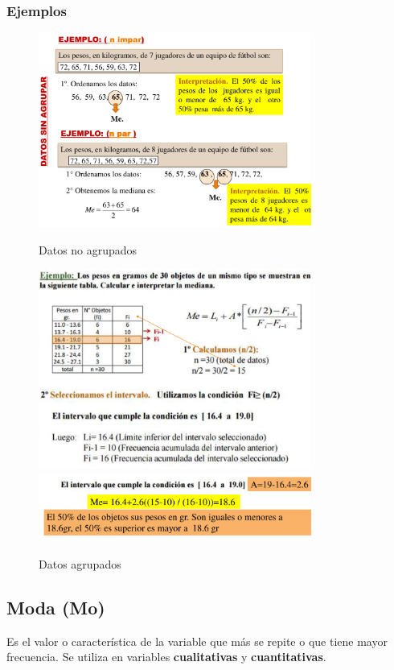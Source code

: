 \documentclass{article}
\begin{document}
        \subsubsection{Ejemplos}
            \begin{figure}[H]
                \centering
                \includegraphics[width=0.8\textwidth]{img/mediana1.png}
                \caption{Datos no agrupados}
                \includegraphics[width=0.8\textwidth]{img/mediana2.png}
                \includegraphics[width=0.8\textwidth]{img/mediana3.png}
                \caption{Datos agrupados}
            \end{figure}
    
    \subsection{Moda (Mo)}
        Es el valor o característica de la variable que más se repite o que tiene mayor frecuencia. Se utiliza en variables \textbf{cualitativas} y \textbf{cuantitativas}.
        
\end{document}
